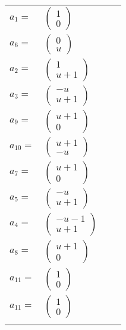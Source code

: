 \documentclass[1p]{elsarticle_modified}
\theoremstyle{definition}
\begin{document}
\begin{tabular}{m{7pt} m{180pt} m{7pt} m{180pt} }
\flushright $a_{1}=$&$\begin{pmatrix}1\\0\end{pmatrix}$ \\
\flushright $a_{6}=$&$\begin{pmatrix}0\\u\end{pmatrix}$ \\
\flushright $a_{2}=$&$\begin{pmatrix}1\\u+1\end{pmatrix}$ \\
\flushright $a_{3}=$&$\begin{pmatrix}- u\\u+1\end{pmatrix}$ \\
\flushright $a_{9}=$&$\begin{pmatrix}u+1\\0\end{pmatrix}$ \\
\flushright $a_{10}=$&$\begin{pmatrix}u+1\\- u\end{pmatrix}$ \\
\flushright $a_{7}=$&$\begin{pmatrix}u+1\\0\end{pmatrix}$ \\
\flushright $a_{5}=$&$\begin{pmatrix}- u\\u+1\end{pmatrix}$ \\
\flushright $a_{4}=$&$\begin{pmatrix}- u-1\\u+1\end{pmatrix}$ \\
\flushright $a_{8}=$&$\begin{pmatrix}u+1\\0\end{pmatrix}$ \\
\flushright $a_{11}=$&$\begin{pmatrix}1\\0\end{pmatrix}$\\ \flushright $a_{11}=$&$\begin{pmatrix}1\\0\end{pmatrix}$\\&\end{tabular}
\end{document}
